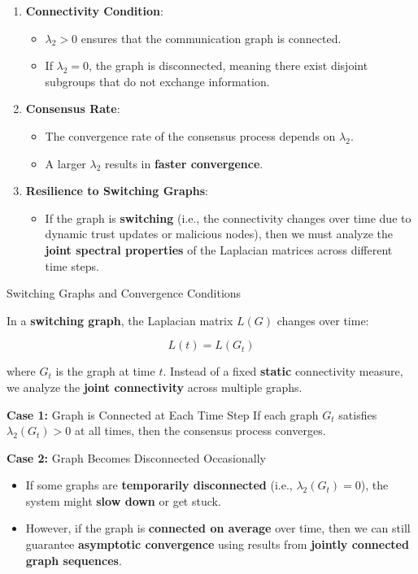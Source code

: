 \documentclass[letterpaper, 10pt, conference]{ieeeconf}  %
\begin{document}
\begin{enumerate}
    \item \textbf{Connectivity Condition}:
    \begin{itemize}
        \item \( \lambda_2 > 0 \) ensures that the communication graph is connected.
        \item If \( \lambda_2 = 0 \), the graph is disconnected, meaning there exist disjoint subgroups that do not exchange information.
    \end{itemize}
    
    \item \textbf{Consensus Rate}:
    \begin{itemize}
        \item The convergence rate of the consensus process depends on \( \lambda_2 \).
        \item A larger \( \lambda_2 \) results in \textbf{faster convergence}.
    \end{itemize}
    
    \item \textbf{Resilience to Switching Graphs}:
    \begin{itemize}
        \item If the graph is \textbf{switching} (i.e., the connectivity changes over time due to dynamic trust updates or malicious nodes), then we must analyze the \textbf{joint spectral properties} of the Laplacian matrices across different time steps.
    \end{itemize}
\end{enumerate}

{Switching Graphs and Convergence Conditions}

In a \textbf{switching graph}, the Laplacian matrix \( L(G) \) changes over time:

\[
L(t) = L(G_t)
\]

where \( G_t \) is the graph at time \( t \). Instead of a fixed \textbf{static} connectivity measure, we analyze the \textbf{joint connectivity} across multiple graphs.

\textbf{Case 1:} Graph is Connected at Each Time Step
If each graph \( G_t \) satisfies \( \lambda_2(G_t) > 0 \) at all times, then the consensus process converges.

\textbf{Case 2:} Graph Becomes Disconnected Occasionally
\begin{itemize}
    \item If some graphs are \textbf{temporarily disconnected} (i.e., \( \lambda_2(G_t) = 0 \)), the system might \textbf{slow down} or get stuck.
    \item However, if the graph is \textbf{connected on average} over time, then we can still guarantee \textbf{asymptotic convergence} using results from \textbf{jointly connected graph sequences}.
\end{itemize}
\end{document}
